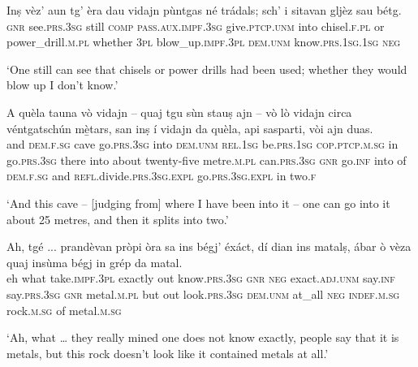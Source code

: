 \begin{linenumbers}
\gll Inṣ vèz’ aun tg’ èra dau vidajn pùntgas né trádals; sch’ i sitavan gljèz sau bétg.   \\
\textsc{gnr} see.\textsc{prs.3sg} still \textsc{comp} \textsc{pass.aux.impf.3sg} give.\textsc{ptcp.unm} into chisel.\textsc{f.pl} or power\_drill.\textsc{m.pl} whether \textsc{3pl} blow\_up.\textsc{impf.3pl} \textsc{dem.unm} know.\textsc{prs.1sg.1sg}  \textsc{neg}  \\
\end{linenumbers}
\medskip
\glt `One still can see that chisels or power drills had been used; whether they would blow up I don’t know.'
\medskip

\begin{linenumbers}
\gll A quèla tauna vò vidajn – quaj tgu sùn stauṣ ajn – vò lò vidajn circa véntgatschún mè̱tars, san inṣ\footnotemark {} í vidajn da quèla, api sasparti, vòi ajn duas.\\
and \textsc{dem.f.sg} cave go.\textsc{prs.3sg} into {}  \textsc{dem.unm} \textsc{rel.1sg} be.\textsc{prs.1sg} \textsc{cop.ptcp.m.sg} in {} go.\textsc{prs.3sg} there into about twenty-five metre.\textsc{m.pl} can.\textsc{prs.3sg} \textsc{gnr} go.\textsc{inf} into of \textsc{dem.f.sg} and \textsc{refl}.divide.\textsc{prs.3sg.expl} go.\textsc{prs.3sg.expl} in two.\textsc{f}  \\
\end{linenumbers}
\medskip
\glt `And this cave – [judging from] where I have been into it – one can go into it about 25 metres, and then it splits into two.'
\medskip

\begin{linenumbers}
\gll   Ah, tgé ... prandèvan pròpi òra sa ins bégj' éxáct, dí dian ins matalṣ, ábar ò vèza quaj insùma bégj in grép da matal. \\
eh what {} take.\textsc{impf.3pl} exactly out know.\textsc{prs.3sg} \textsc{gnr} \textsc{neg} exact.\textsc{adj.unm} say.\textsc{inf} say.\textsc{prs.3sg} \textsc{gnr}  metal.\textsc{m.pl} but out look.\textsc{prs.3sg} \textsc{dem.unm} at\_all \textsc{neg} \textsc{indef.m.sg} rock.\textsc{m.sg} of metal.\textsc{m.sg}\\
\end{linenumbers}
\medskip
\glt `Ah, what … they really mined one does not know exactly, people say that it is metals, but this rock doesn't look like it contained metals at all.'
\medskip

